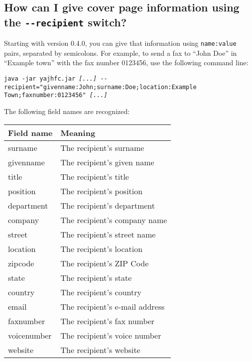 \documentclass[a4paper,10pt]{scrartcl}
\begin{document}
\subsection{How can I give cover page information using the \texttt{-{-}recipient} switch?}

Starting with version 0.4.0, you can give that information using \texttt{name:value} pairs, separated by semicolons. For example, to send a fax to ``John Doe'' in ``Example town'' with the fax number 0123456, use the following command line:

\texttt{java -jar yajhfc.jar \textit{[...]} -{-}recipient="givenname:John;surname:Doe;location:Example Town;faxnumber:0123456" \textit{[...]}}

The following field names are recognized:
\begin{center}
\begin{tabular}{|l|p{}|}
\hline
\bfseries Field name & \bfseries Meaning \\
\hline\hline
\ttfamily surname & The recipient's surname\\\hline
\ttfamily givenname & The recipient's given name \\\hline
\ttfamily title & The recipient's title \\\hline
\ttfamily position & The recipient's position \\\hline
\ttfamily department & The recipient's department\\\hline
\ttfamily company & The recipient's company name\\\hline
\ttfamily street & The recipient's street name \\\hline
\ttfamily location & The recipient's location\\\hline
\ttfamily zipcode & The recipient's ZIP Code \\\hline
\ttfamily state & The recipient's state\\\hline
\ttfamily country & The recipient's country\\\hline
\ttfamily email & The recipient's e-mail address\\\hline
\ttfamily faxnumber & The recipient's fax number \\\hline
\ttfamily voicenumber & The recipient's voice number \\\hline
\ttfamily website & The recipient's website\\\hline
\end{tabular}
\end{center}
\end{document}
